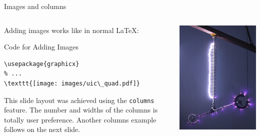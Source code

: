 \documentclass{beamer}
\begin{document}
\begin{frame}[fragile]{Images and columns}
\begin{columns}
\begin{column}{0.7\textwidth}
Adding images works like in normal \LaTeX:
\begin{block}{Code for Adding Images}
\begin{verbatim}
\usepackage{graphicx}
% ...
\texttt{[image: images/uic\_quad.pdf]}
\end{verbatim}
\end{block}
This slide layout was achieved using the \verb|columns| feature. The number and widths of the columns is totally user preference. Another columns example follows on the next slide.
\end{column}
\begin{column}{0.3\textwidth}
\includegraphics[width=\textwidth]
{images/back_flashover.png}
\end{column}
\end{columns}
\end{frame}
\end{document}
